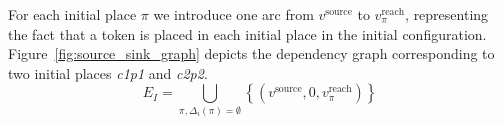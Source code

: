 





For each initial place $\pi$ we introduce one arc from $v^\text{source}$
to $v_\pi^\text{reach}$, representing the fact that a token is placed in each
initial place in the initial configuration.
Figure~\ref{fig:source_sink_graph} depicts the dependency graph corresponding to two initial
places \emph{c1p1} and \emph{c2p2}.
\[
E_I=\bigcup_{\pi, \Delta_i(\pi) = \emptyset}\left\{ \left(v^\text{source},0,v_\pi^\text{reach}\right)\right\} 
\]

